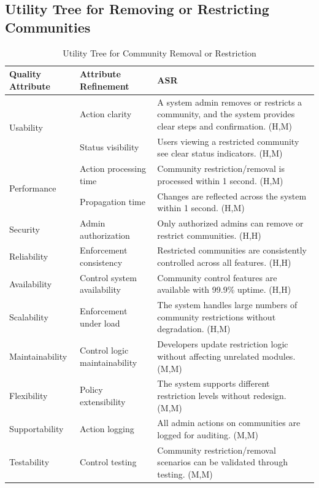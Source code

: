 \documentclass{article}
\begin{document}
\subsection{Utility Tree for Removing or Restricting Communities}

\begin{table}[H]
\centering
\caption{Utility Tree for Community Removal or Restriction}
\begin{tabular}{|p{3cm}|p{4cm}|p{7cm}|}
\hline
\textbf{Quality Attribute} & \textbf{Attribute Refinement} & \textbf{ASR} \\
\hline

\multirow{2}{*}{Usability}
& Action clarity
& A system admin removes or restricts a community, and the system provides clear steps and confirmation. (H,M) \\
\cline{2-3}
& Status visibility
& Users viewing a restricted community see clear status indicators. (H,M) \\
\hline

\multirow{2}{*}{Performance}
& Action processing time
& Community restriction/removal is processed within 1 second. (H,M) \\
\cline{2-3}
& Propagation time
& Changes are reflected across the system within 1 second. (H,M) \\
\hline

Security
& Admin authorization
& Only authorized admins can remove or restrict communities. (H,H) \\
\hline

Reliability
& Enforcement consistency
& Restricted communities are consistently controlled across all features. (H,H) \\
\hline

Availability
& Control system availability
& Community control features are available with 99.9\% uptime. (H,H) \\
\hline

Scalability
& Enforcement under load
& The system handles large numbers of community restrictions without degradation. (H,M) \\
\hline

Maintainability
& Control logic maintainability
& Developers update restriction logic without affecting unrelated modules. (M,M) \\
\hline

Flexibility
& Policy extensibility
& The system supports different restriction levels without redesign. (M,M) \\
\hline

Supportability
& Action logging
& All admin actions on communities are logged for auditing. (M,M) \\
\hline

Testability
& Control testing
& Community restriction/removal scenarios can be validated through testing. (M,M) \\
\hline

\end{tabular}
\end{table}
\end{document}
